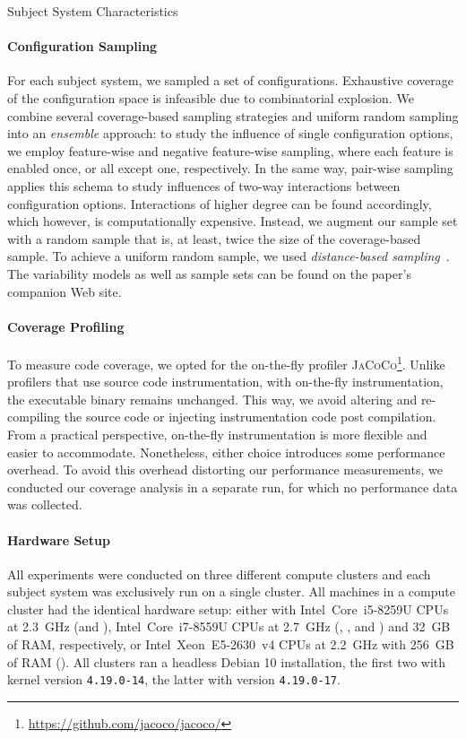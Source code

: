 {	\begin{table*}[ht!]
		\centering
		\caption{Subject System Characteristics}
		
		\label{tab:subject_systems}
	\end{table*}

	\paragraph*{Configuration Sampling}\label{sec:sampling}
	For each subject system, we sampled a set of configurations. Exhaustive coverage of the configuration space is infeasible due to combinatorial explosion. We combine several coverage-based sampling strategies and uniform random sampling into an \emph{ensemble} approach: to study the influence of single configuration options, we employ feature-wise and negative feature-wise sampling, where each feature is enabled once, or all except one, respectively. In the same way, pair-wise sampling applies this schema to study influences of two-way interactions between configuration options. Interactions of higher degree can be found accordingly, which however, is computationally expensive. Instead, we augment our sample set with a random sample that is, at least, twice the size of the coverage-based sample. To achieve a uniform random sample, we used \emph{distance-based sampling}~\cite{kaltenecker_distance-based_2019}. The variability models as well as sample sets can be found on the paper's companion Web site.
	
	\paragraph*{Coverage Profiling}\label{sec:profiling}
	To measure code coverage, we opted for the on-the-fly profiler \textsc{JaCoCo}\footnote{\url{https://github.com/jacoco/jacoco/}}. Unlike profilers that use source code instrumentation, with on-the-fly instrumentation, the executable binary remains unchanged. This way, we avoid altering and re-compiling the source code or injecting instrumentation code post compilation. From a practical perspective, on-the-fly instrumentation is more flexible and easier to accommodate. Nonetheless, either choice introduces some performance overhead. To avoid this overhead distorting our performance measurements, we conducted our coverage analysis in a separate run, for which no performance data was collected. 	
	
	\paragraph*{Hardware Setup}
	All experiments were conducted on three different compute clusters and each subject system was exclusively run on a single cluster. All machines in a compute cluster had the identical hardware setup: either with Intel~Core~i5-8259U CPUs at 2.3~GHz (\jumper and \kanzi),  Intel~Core~i7-8559U CPUs at 2.7~GHz (\dconvert, \batik, and \jadx) and 32~GB of RAM, respectively, or Intel~Xeon~E5-2630~v4 CPUs at 2.2~GHz with 256~GB of RAM (\htwo). All clusters ran a headless Debian 10 installation, the first two with kernel version \mbox{\texttt{4.19.0-14}}, the latter with version \mbox{\texttt{4.19.0-17}}. 
	
}
